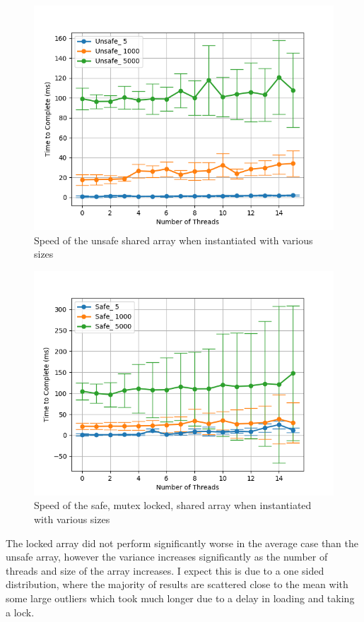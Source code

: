 \documentclass[11pt]{article}
\begin{document}
\begin{figure}\label{step3_1}
\centering
\includegraphics[scale=0.65]{step3_1.png}
\caption{Speed of the unsafe shared array when instantiated with various sizes}
\end{figure}


\begin{figure}\label{step3_2}
\centering
\includegraphics[scale=0.65]{step3_2.png}
\caption{Speed of the safe, mutex locked, shared array when instantiated with various sizes}
\end{figure}

The locked array did not perform significantly worse in the average case than the unsafe array,
however the variance increases significantly as the number of threads and size of the array increases. I expect this is due to a one sided distribution, where the majority of results are scattered close to the mean with some large outliers which took much longer due to a delay in loading and taking a lock.
\end{document}
